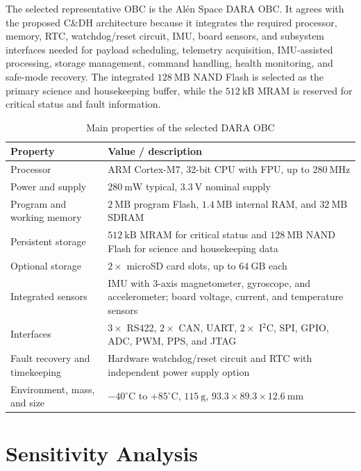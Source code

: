 The selected representative OBC is the Alén Space DARA OBC. It agrees with the proposed C\&DH architecture because it integrates the required processor, memory, RTC, watchdog/reset circuit, IMU, board sensors, and subsystem interfaces needed for payload scheduling, telemetry acquisition, IMU-assisted processing, storage management, command handling, health monitoring, and safe-mode recovery. The integrated \(128~\mathrm{MB}\) NAND Flash is selected as the primary science and housekeeping buffer, while the \(512~\mathrm{kB}\) MRAM is reserved for critical status and fault information.

\begin{table}[H]
\centering
\caption{Main properties of the selected DARA OBC}
\label{tab:dara_obc_properties}
\small
\renewcommand{\arraystretch}{1.12}
\begin{tabular}{p{4.0cm} p{8.5cm}}
\hline
\textbf{Property} & \textbf{Value / description} \\
\hline
Processor & ARM Cortex-M7, 32-bit CPU with FPU, up to \(280~\mathrm{MHz}\) \\
\hline
Power and supply & \(280~\mathrm{mW}\) typical, \(3.3~\mathrm{V}\) nominal supply \\
\hline
Program and working memory & \(2~\mathrm{MB}\) program Flash, \(1.4~\mathrm{MB}\) internal RAM, and \(32~\mathrm{MB}\) SDRAM \\
\hline
Persistent storage & \(512~\mathrm{kB}\) MRAM for critical status and \(128~\mathrm{MB}\) NAND Flash for science and housekeeping data \\
\hline
Optional storage & \(2\times\) microSD card slots, up to \(64~\mathrm{GB}\) each \\
\hline
Integrated sensors & IMU with 3-axis magnetometer, gyroscope, and accelerometer; board voltage, current, and temperature sensors \\
\hline
Interfaces & \(3\times\) RS422, \(2\times\) CAN, UART, \(2\times\) I\(^2\)C, SPI, GPIO, ADC, PWM, PPS, and JTAG \\
\hline
Fault recovery and timekeeping & Hardware watchdog/reset circuit and RTC with independent power supply option \\
\hline
Environment, mass, and size & \(-40^\circ\mathrm{C}\) to \(+85^\circ\mathrm{C}\), \(115~\mathrm{g}\), \(93.3 \times 89.3 \times 12.6~\mathrm{mm}\) \\
\hline
\end{tabular}
\end{table}

\section{Sensitivity Analysis}

